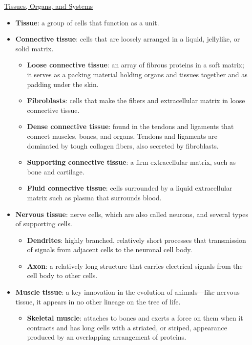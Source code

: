 \documentclass[12pt,letterpaper]{article}
\begin{document}
\hypertarget{39.2}{}
\begin{secbox}{\hyperlink{39}{Tissues, Organs, and Systems}}{
    \begin{itemize}
        \item \textbf{Tissue}: a group of cells that function as a unit.
        \item \textbf{Connective tissue}: cells that are loosely arranged in a liquid, jellylike, or solid matrix.
        \begin{itemize}
            \item \textbf{Loose connective tissue}: an array of fibrous proteins in a soft matrix; it serves as a packing material holding organs and tissues together and as padding under the skin. 
            \item \textbf{Fibroblasts}: cells that make the fibers and extracellular matrix in loose connective tissue.
            \item \textbf{Dense connective tissue}: found in the tendons and ligaments that connect muscles, bones, and organs. Tendons and ligaments are dominated by
            tough collagen fibers, also secreted by fibroblasts.
            \item \textbf{Supporting connective tissue}: a firm extracellular matrix, such as bone and cartilage.
            \item \textbf{Fluid connective tissue}: cells surrounded by a liquid extracellular matrix such as plasma that surrounds blood.
        \end{itemize}
        \item \textbf{Nervous tissue}: nerve cells, which are also called neurons, and several types of supporting cells.
        \begin{itemize}
            \item \textbf{Dendrites}: highly branched, relatively short processes that transmission of signals from adjacent cells to the neuronal cell body.
            \item \textbf{Axon}: a relatively long structure that carries electrical signals from the cell body to other cells.
        \end{itemize}
        \item \textbf{Muscle tissue}: a key innovation in the evolution of animals—like nervous tissue, it appears in no other lineage on the tree of life.
        \begin{itemize}
            \item \textbf{Skeletal muscle}: attaches to bones and exerts a force on them when it contracts and has long cells with a striated, or striped, appearance produced by an overlapping arrangement of proteins.

\end{itemize}
\end{itemize}}
\end{secbox}
\end{document}
